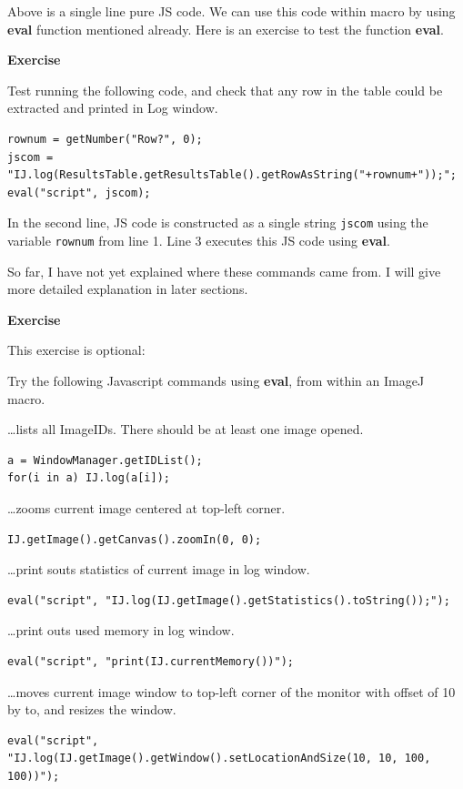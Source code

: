 \documentclass[11pt,a4paper,oneside]{report}
\newenvironment{indentexercise}[1]%
{{\setlength{\leftmargin}{2em}}%
\textbf{Exercise \thesubsection-#1}%
\begin{list}{}%
	\item%
}
{\end{list}}
\newcommand{\ilcom}[1]{\texttt{\small#1}}
\begin{document}
Above is a single line pure JS code. 
We can use this code within macro by using \textbf{eval} function mentioned already. 
Here is an exercise to test the function \textbf{eval}. 

\begin{indentexercise}{2}
Test running the following code, and check that any row in the table could be extracted 
and printed in Log window. 
\begin{lstlisting}
rownum = getNumber("Row?", 0);
jscom = "IJ.log(ResultsTable.getResultsTable().getRowAsString("+rownum+"));";
eval("script", jscom);
\end{lstlisting}
\end{indentexercise}

In the second line, JS code is constructed as a single string \ilcom{jscom} 
using the variable \ilcom{rownum} from line 1. Line 3 executes this JS code using \textbf{eval}. 

So far, I have not yet explained where these commands came from. 
I will give more detailed explanation in later sections.  

\begin{indentexercise}{2}
This exercise is optional:

Try the following Javascript commands using \textbf{eval}, from within an ImageJ
macro.

\dots lists all ImageIDs. There should be at least one image opened. 
\begin{lstlisting}[numbers=none]
a = WindowManager.getIDList();
for(i in a) IJ.log(a[i]);
\end{lstlisting}

\dots zooms current image centered at top-left corner.
\begin{lstlisting}[numbers=none]
IJ.getImage().getCanvas().zoomIn(0, 0);
\end{lstlisting}

\dots print souts statistics of current image in log window.
\begin{lstlisting}[numbers=none]
eval("script", "IJ.log(IJ.getImage().getStatistics().toString());");
\end{lstlisting}

\dots print outs used memory in log window.
\begin{lstlisting}[numbers=none]
eval("script", "print(IJ.currentMemory())");
\end{lstlisting}

\dots moves current image window to top-left corner of the monitor with offset of 10 by to, 
and resizes the window. 
\begin{lstlisting}[numbers=none]
eval("script", "IJ.log(IJ.getImage().getWindow().setLocationAndSize(10, 10, 100, 100))");
\end{lstlisting}
\end{indentexercise}
\end{document}
